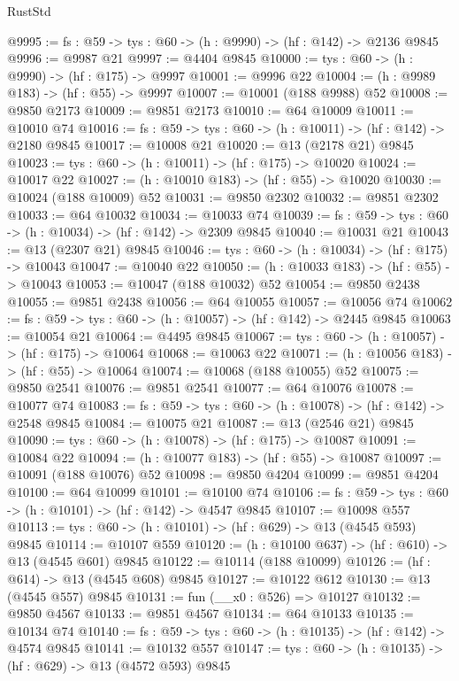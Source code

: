 \begin{lexlean}{RustStd}
\begin{coremodule}
@9995 := {fs : @59} -> {tys : @60} -> (h : @9990) -> (hf : @142) -> @2136 @9845
@9996 := @9987 @21
@9997 := @4404 @9845
@10000 := {tys : @60} -> (h : @9990) -> (hf : @175) -> @9997
@10001 := @9996 @22
@10004 := (h : @9989 @183) -> (hf : @55) -> @9997
@10007 := @10001 (@188 @9988) @52
@10008 := @9850 @2173
@10009 := @9851 @2173
@10010 := @64 @10009
@10011 := @10010 @74
@10016 := {fs : @59} -> {tys : @60} -> (h : @10011) -> (hf : @142) -> @2180 @9845
@10017 := @10008 @21
@10020 := @13 (@2178 @21) @9845
@10023 := {tys : @60} -> (h : @10011) -> (hf : @175) -> @10020
@10024 := @10017 @22
@10027 := (h : @10010 @183) -> (hf : @55) -> @10020
@10030 := @10024 (@188 @10009) @52
@10031 := @9850 @2302
@10032 := @9851 @2302
@10033 := @64 @10032
@10034 := @10033 @74
@10039 := {fs : @59} -> {tys : @60} -> (h : @10034) -> (hf : @142) -> @2309 @9845
@10040 := @10031 @21
@10043 := @13 (@2307 @21) @9845
@10046 := {tys : @60} -> (h : @10034) -> (hf : @175) -> @10043
@10047 := @10040 @22
@10050 := (h : @10033 @183) -> (hf : @55) -> @10043
@10053 := @10047 (@188 @10032) @52
@10054 := @9850 @2438
@10055 := @9851 @2438
@10056 := @64 @10055
@10057 := @10056 @74
@10062 := {fs : @59} -> {tys : @60} -> (h : @10057) -> (hf : @142) -> @2445 @9845
@10063 := @10054 @21
@10064 := @4495 @9845
@10067 := {tys : @60} -> (h : @10057) -> (hf : @175) -> @10064
@10068 := @10063 @22
@10071 := (h : @10056 @183) -> (hf : @55) -> @10064
@10074 := @10068 (@188 @10055) @52
@10075 := @9850 @2541
@10076 := @9851 @2541
@10077 := @64 @10076
@10078 := @10077 @74
@10083 := {fs : @59} -> {tys : @60} -> (h : @10078) -> (hf : @142) -> @2548 @9845
@10084 := @10075 @21
@10087 := @13 (@2546 @21) @9845
@10090 := {tys : @60} -> (h : @10078) -> (hf : @175) -> @10087
@10091 := @10084 @22
@10094 := (h : @10077 @183) -> (hf : @55) -> @10087
@10097 := @10091 (@188 @10076) @52
@10098 := @9850 @4204
@10099 := @9851 @4204
@10100 := @64 @10099
@10101 := @10100 @74
@10106 := {fs : @59} -> {tys : @60} -> (h : @10101) -> (hf : @142) -> @4547 @9845
@10107 := @10098 @557
@10113 := {tys : @60} -> (h : @10101) -> (hf : @629) -> @13 (@4545 @593) @9845
@10114 := @10107 @559
@10120 := (h : @10100 @637) -> (hf : @610) -> @13 (@4545 @601) @9845
@10122 := @10114 (@188 @10099)
@10126 := (hf : @614) -> @13 (@4545 @608) @9845
@10127 := @10122 @612
@10130 := @13 (@4545 @557) @9845
@10131 := fun (__x0 : @526) => @10127
@10132 := @9850 @4567
@10133 := @9851 @4567
@10134 := @64 @10133
@10135 := @10134 @74
@10140 := {fs : @59} -> {tys : @60} -> (h : @10135) -> (hf : @142) -> @4574 @9845
@10141 := @10132 @557
@10147 := {tys : @60} -> (h : @10135) -> (hf : @629) -> @13 (@4572 @593) @9845

\end{coremodule}
\end{lexlean}
